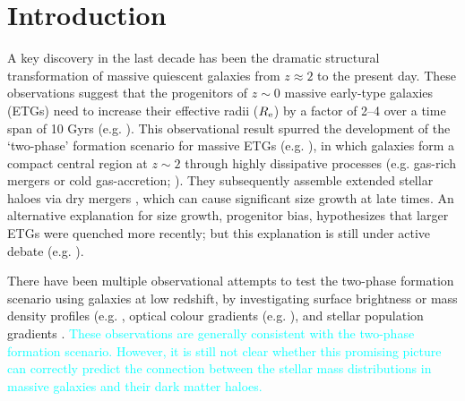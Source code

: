 \documentclass[a4paper,fleqn,usenatbib]{mnras}
\newcommand{\song}[1]{\textcolor{cyan}{#1}}
\begin{document}



\section{Introduction}
    \label{sec:intro}
    
    A key discovery in the last decade has been the dramatic structural transformation 
    of massive quiescent galaxies \citep[e.g.][]{Trujillo2006, vanDokkum2008, 
    Cimatti2008, Damjanov2009, vanderWel2011, Szomoru2012, Patel2013} from 
    $z \approx 2$ to the present day. 
    These observations suggest that the progenitors of $z{\sim} 0$ massive early-type 
    galaxies (ETGs) need to increase their effective radii ($R_{\rm e}$) by a factor 
    of 2--4 over a time span of 10 Gyrs (e.g. \citealt{Newman2012, vdWel2014}). 
    This observational result spurred the development of the `two-phase' formation
    scenario for massive ETGs (e.g. \citealt{Oser2010, Oser2012}),
    in which galaxies form a compact central region at $z\sim 2$ through highly 
    dissipative processes (e.g. gas-rich mergers or cold gas-accretion;
    \citealt{Hopkins2008, Dekel2009}). 
    They subsequently assemble extended stellar haloes via dry mergers 
    \citep[e.g,][]{Naab2006, Khochfar2006, Oser2010, Oser2012}, which can cause 
    significant size growth at late times. 
    An alternative explanation for size growth, progenitor bias, hypothesizes that 
    larger ETGs were quenched more recently; but this explanation is still under 
    active debate (e.g. \citealt{Newman2012, Carollo2013, Poggianti2013, Belli2015,
    Keating2015, Fagioli2016}). 
    
    There have been multiple observational attempts to test the two-phase 
    formation scenario using galaxies at low redshift, by investigating surface 
    brightness or mass density profiles (e.g. \citealt{Huang2013a, Huang2013b, 
    Oh2017}, optical colour gradients (e.g. \citealt{LaBarbera2010, LaBarbera2012}), 
    and stellar population gradients \citep[e.g.,][]{Coccato2010, Coccato2011, 
    Greene2015, Barbosa2016}. 
    \song{
    These observations are generally consistent with the two-phase formation scenario. 
    However, it is still not clear whether this promising picture can correctly 
    predict the connection between the stellar mass distributions in massive galaxies 
    and their dark matter haloes.
    }
    
\end{document}
